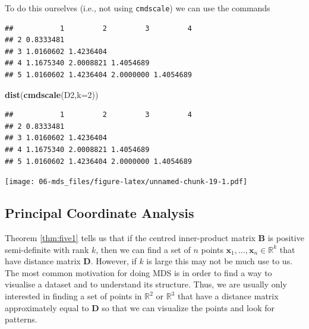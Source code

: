 \documentclass[
]{book}
\newenvironment{Shaded}{\begin{snugshade}}{\end{snugshade}}
\newcommand{\AttributeTok}[1]{\textcolor[rgb]{0.13,0.29,0.53}{#1}}
\newcommand{\DecValTok}[1]{\textcolor[rgb]{0.00,0.00,0.81}{#1}}
\newcommand{\FunctionTok}[1]{\textcolor[rgb]{0.13,0.29,0.53}{\textbf{#1}}}
\newcommand{\NormalTok}[1]{#1}
\newcommand{\OtherTok}[1]{\textcolor[rgb]{0.56,0.35,0.01}{#1}}
\newcommand{\SpecialCharTok}[1]{\textcolor[rgb]{0.81,0.36,0.00}{\textbf{#1}}}
\theoremstyle{definition}
\theoremstyle{definition}
\theoremstyle{definition}
\theoremstyle{definition}
\theoremstyle{remark}
\begin{document}
To do this ourselves (i.e., not using \texttt{cmdscale}) we can use the commands

\begin{Shaded}
\end{Shaded}

\begin{verbatim}
##           1         2         3         4
## 2 0.8333481                              
## 3 1.0160602 1.4236404                    
## 4 1.1675340 2.0008821 1.4054689          
## 5 1.0160602 1.4236404 2.0000000 1.4054689
\end{verbatim}

\begin{Shaded}
\begin{Highlighting}[]
\FunctionTok{dist}\NormalTok{(}\FunctionTok{cmdscale}\NormalTok{(D2,}\AttributeTok{k=}\DecValTok{2}\NormalTok{))}
\end{Highlighting}
\end{Shaded}

\begin{verbatim}
##           1         2         3         4
## 2 0.8333481                              
## 3 1.0160602 1.4236404                    
## 4 1.1675340 2.0008821 1.4054689          
## 5 1.0160602 1.4236404 2.0000000 1.4054689
\end{verbatim}

\texttt{[image: 06-mds\_files/figure-latex/unnamed-chunk-19-1.pdf]}

\subsection{Principal Coordinate Analysis}\label{principal-coordinate-analysis}

Theorem \ref{thm:five1} tells us that if the centred inner-product matrix
\(\mathbf B\) is positive semi-definite with rank \(k\), then we can find a set of \(n\) points \(\mathbf x_1,\ldots, \mathbf x_n \in \mathbb{R}^k\) that have distance matrix \(\mathbf D\). However, if \(k\) is large this may not be much use to us. The most common motivation for doing MDS is in order to find a way to visualise a dataset and to understand its structure. Thus, we are usually only interested in finding a set of points in \(\mathbb{R}^2\) or \(\mathbb{R}^3\) that have a distance matrix approximately equal to \(\mathbf D\) so that we can visualize the points and look for patterns.
\end{document}
